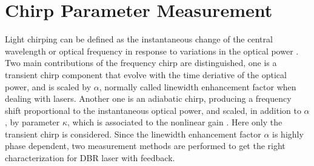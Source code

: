 




\section{Chirp Parameter Measurement}\label{sec:chirp_measurement}
Light chirping can be defined as the instantaneous change of the central wavelength or optical frequency in response to variations in the optical power \cite{villafranca2007precise}. Two main contributions of the frequency chirp are distinguished, one is a transient chirp component that evolve with the time deriative of the optical power, and is scaled by $\alpha$, normally called linewidth enhancement factor when dealing with lasers. Another one is an adiabatic chirp, producing a frequency shift proportional to the instantaneous optical power, and scaled, in addition to $\alpha$, by parameter $\kappa$, which is associated to the nonlinear gain \cite{villafranca2007precise, harder1983measurement}. Here only the transient chirp is considered. Since the linewidth enhancement factor $\alpha$ is highly phase dependent, two measurement methods are performed to get the right characterization for DBR laser with feedback.

